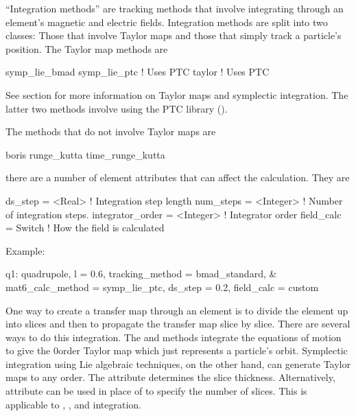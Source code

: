 ``Integration methods'' are tracking methods that involve integrating
through an element's magnetic and electric fields.  Integration
methods are split into two classes: Those that involve Taylor maps and
those that simply track a particle's position.  The Taylor map methods
are
\begin{example}
  symp_lie_bmad
  symp_lie_ptc    ! Uses PTC
  taylor          ! Uses PTC
\end{example}
See section  for more information on Taylor maps
and symplectic integration. The latter two methods involve using the
PTC library ().

The methods that do not involve Taylor maps are
\begin{example}
  boris
  runge_kutta
  time_runge_kutta
\end{example}

there are a number of element attributes that can affect the
calculation. They are
\begin{example}
  ds_step = <Real>              ! Integration step length
  num_steps = <Integer>         ! Number of integration steps.
  integrator_order = <Integer>  ! Integrator order
  field_calc = Switch           ! How the field is calculated
\end{example}

Example:
\begin{example}
  q1: quadrupole, l = 0.6, tracking_method = bmad_standard, &
        mat6_calc_method = symp_lie_ptc, ds_step = 0.2, field_calc = custom
\end{example}

One way to create a transfer map through an element is to divide the
element up into slices and then to propagate the transfer map slice by
slice.  There are several ways to do this integration. The 
and  methods integrate the equations of motion to
give the 0\Th order Taylor map which just represents a particle's
orbit.  Symplectic integration using Lie
algebraic techniques, on the other hand, can generate Taylor maps to
any order.  The  attribute determines the slice thickness.
Alternatively,  attribute can be used in place of
 to specify the number of slices.
This is applicable to , , and
 integration.

